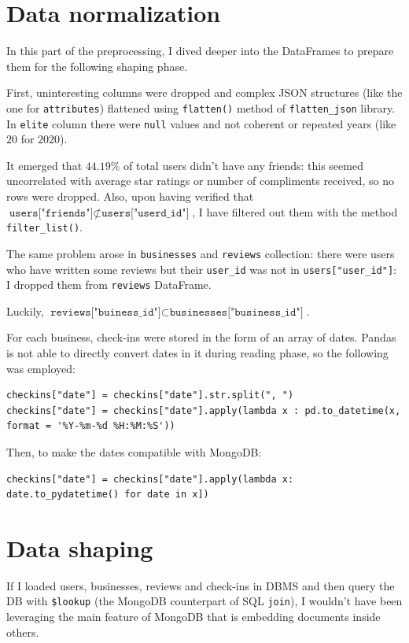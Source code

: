 \documentclass{Configuration_Files/PoliMi3i_thesis}
\begin{document}
\section{Data normalization}
In this part of the preprocessing, I dived deeper into the DataFrames to prepare them for the following shaping phase. 

First, uninteresting columns were dropped and complex JSON structures (like the one for \texttt{attributes}) flattened using \texttt{flatten()} method of \texttt{flatten\_json} library. In \texttt{elite} column there were \texttt{null} values and not coherent or repeated years (like $20$ for $2020$). 

It emerged that $44.19\%$ of total users didn't have any friends: this seemed uncorrelated with average star ratings or number of compliments received, so no rows were dropped. Also, upon having verified that $\texttt{users["friends"]} \not \subset \texttt{users["userd\_id"]}$, I have filtered out them with the method \texttt{filter\_list()}.

The same problem arose in \texttt{businesses} and \texttt{reviews} collection: there were users who have written some reviews but their \texttt{user\_id} was not in \texttt{users["user\_id"]}: I dropped them from \texttt{reviews} DataFrame. 

Luckily, $\texttt{reviews["buiness\_id"]} \subset \texttt{businesses["business\_id"]}$. 

For each business, check-ins were stored in the form of an array of dates. Pandas is not able to directly convert dates in it during reading phase, so the following was employed:

\bigskip

\begin{verbatim}
checkins["date"] = checkins["date"].str.split(", ")
checkins["date"] = checkins["date"].apply(lambda x : pd.to_datetime(x, 
format = '%Y-%m-%d %H:%M:%S'))
\end{verbatim}

\bigskip

Then, to make the dates compatible with MongoDB:
\begin{verbatim}
checkins["date"] = checkins["date"].apply(lambda x: 
date.to_pydatetime() for date in x])
\end{verbatim}

\section{Data shaping}
If I loaded users, businesses, reviews and check-ins in DBMS and then query the DB with \texttt{\$lookup} (the MongoDB counterpart of SQL \texttt{join}), I wouldn't have been leveraging the main feature of MongoDB that is embedding documents inside others.
\end{document}
